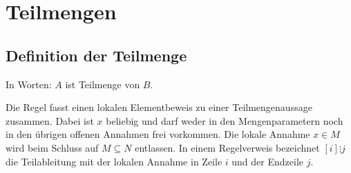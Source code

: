 \documentclass[main.tex]{subfiles}
\begin{document}
\begin{tabproof}
\end{tabproof}

\begin{tabproof}
\end{tabproof}


\chapter{Teilmengen}

\section{Definition der Teilmenge}

%
{%
%
}
\begin{remark}
    In Worten: \(A\) ist Teilmenge von \(B\).
\end{remark}

\noindent\begin{minipage}{\linewidth}
\end{minipage}\par
Die Regel fasst einen lokalen Elementbeweis zu einer Teilmengenaussage
zusammen. Dabei ist \(x\) beliebig und darf weder in den Mengenparametern
noch in den übrigen offenen Annahmen frei vorkommen. Die lokale Annahme
\(x\in M\) wird beim Schluss auf \(M\subseteq N\) entlassen.
In einem Regelverweis bezeichnet \([i]\vdots j\) die Teilableitung
mit der lokalen Annahme in Zeile \(i\) und der Endzeile \(j\).
\begin{tabproof}
\end{tabproof}
\end{document}
